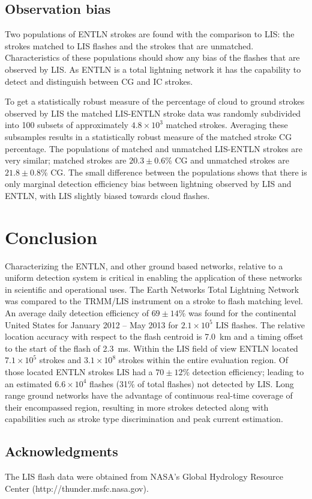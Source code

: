 \subsection{Observation bias}

Two populations of ENTLN strokes are found with the comparison to LIS: the strokes matched to LIS flashes and the strokes that are unmatched.
Characteristics of these populations should show any bias of the flashes that are observed by LIS.
As ENTLN is a total lightning network it has the capability to detect and distinguish between CG and IC strokes.

To get a statistically robust measure of the percentage of cloud to ground strokes observed by LIS the matched LIS-ENTLN stroke data was randomly subdivided into 100 subsets of approximately $4.8\times10^3$ matched strokes.
Averaging these subsamples results in a statistically robust measure of the matched stroke CG percentage.
The populations of matched and unmatched LIS-ENTLN strokes are very similar; matched strokes are $20.3\pm0.6$\% CG and unmatched strokes are $21.8\pm0.8$\% CG.
The small difference between the populations shows that there is only marginal detection efficiency bias between lightning observed by LIS and ENTLN, with LIS slightly biased towards cloud flashes.

\section{Conclusion}

Characterizing the ENTLN, and other ground based networks, relative to a uniform detection system is critical in enabling the application of these networks in scientific and operational uses.
The Earth Networks Total Lightning Network was compared to the TRMM/LIS instrument on a stroke to flash matching level.
An average daily detection efficiency of $69\pm 14$\% was found for the continental United States for January 2012 -- May 2013 for $2.1 \times 10^5$ LIS flashes.
The relative location accuracy with respect to the flash centroid is 7.0~km and a timing offset to the start of the flash of 2.3~ms.
Within the LIS field of view ENTLN located $7.1\times 10^5$ strokes and $3.1\times10^8$ strokes within the entire evaluation region.
Of those located ENTLN strokes LIS had a $70 \pm 12$\% detection efficiency; leading to an estimated $6.6 \times 10^4$ flashes (31\% of total flashes) not detected by LIS.
Long range ground networks have the advantage of continuous real-time coverage of their encompassed region, resulting in more strokes detected along with capabilities such as stroke type discrimination and peak current estimation.

\subsection*{Acknowledgments}

The LIS flash data were obtained from NASA's Global Hydrology Resource Center (http://thunder.msfc.nasa.gov).

